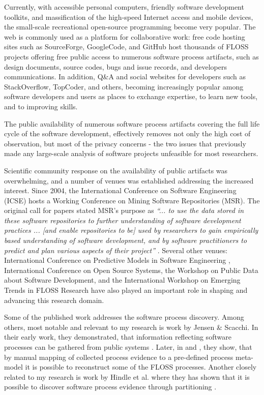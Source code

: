 Currently, with accessible personal computers, friendly software development toolkits, and massification of 
the high-speed Internet access and mobile devices, the small-scale recreational open-source programming 
become very popular. 
The web is commonly used as a platform for collaborative work: free code hosting sites such as SourceForge, 
GoogleCode, and GitHub host thousands of FLOSS projects offering free public access to numerous software 
process artifacts, such as design documents, source codes, bugs and issue records, and developers communications.
In addition, Q\&A and social websites for developers such as StackOverflow, TopCoder, and others, becoming 
increasingly popular among software developers and users as places to exchange expertise, to learn new tools, 
and to improving skills.

The public availability of numerous software process artifacts covering the full life cycle of the software
development, effectively removes not only the high cost of observation, but most of the privacy concerns - 
the two issues that previously made any large-scale analysis of software projects unfeasible for most researchers.

Scientific community response on the availability of public artifacts was overwhelming, and a number of 
venues was established addressing the increased interest. 
Since 2004, the International Conference on Software Engineering (ICSE) hosts a Working Conference on 
Mining Software Repositories (MSR). The original call for papers stated MSR's purpose as 
\textit{``... to use the data stored in these software repositories to further understanding of software 
development practices ... [and enable repositories to be] used by researchers to gain empirically based 
understanding of software development, and by software practitioners to predict and plan various aspects 
of their project''} \cite{msr2004} \cite{citeulike:7853299}. 
Several other venues: International Conference on Predictive Models in Software Engineering \cite{promise12}, 
International Conference on Open Source Systems, the Workshop on Public Data about Software Development, 
and the International Workshop on Emerging Trends in FLOSS Research have also played
an important role in shaping and advancing this research domain.

Some of the published work addresses the software process discovery. Among others, most notable and 
relevant to my research is work by Jensen \& Scacchi. In their early work, they demonstrated, that 
information reflecting software processes can be gathered from public systems \cite{citeulike:12550640}. 
Later, in \cite{citeulike:5043664} and \cite{citeulike:5128808}, they show, that by manual mapping of 
collected process evidence to a pre-defined process meta-model it is possible to reconstruct some 
of the FLOSS processes. 
Another closely related to my research is work by Hindle et al. where they has shown that it is possible to 
discover software process evidence through partitioning \cite{citeulike:10377366}.

